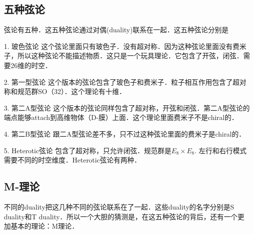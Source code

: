 \subsection{五种弦论}

弦论有五种．这五种弦论通过对偶(duality)联系在一起．这五种弦论分别是

1. 玻色弦论
这个弦论里面只有玻色子．没有超对称．因为这种弦论里面没有费米子，所以这种弦论不能描述物质．这只是一个玩具理论．它包含了开弦，闭弦．需要26维的时空．

2. 第一型弦论
这个版本的弦论包含了玻色子和费米子．粒子相互作用包含了超对称和规范群SO（32）．这个理论有十维．

3. 第二A型弦论
这个版本的弦论同样包含了超对称，开弦和闭弦．第二A型弦论的端点能够attach到高维物体（D-膜）上面．这个理论里面费米子不是chiral的．

4. 第二B型弦论
跟二A型弦论差不多，只不过这种弦论里面的费米子是chiral的．

5. Heterotic弦论
包含了超对称，只允许闭弦．规范群是$E_8\times E_8$. 左行和右行模式需要不同的时空维度．Heterotic弦论有两种．

\subsection{M-理论}
不同的duality把这几种不同的弦论联系在了一起．这些duality的名字分别是S duality和T duality．所以一个大胆的猜测是，在这五种弦论的背后，还有一个更加基本的理论：M理论．
